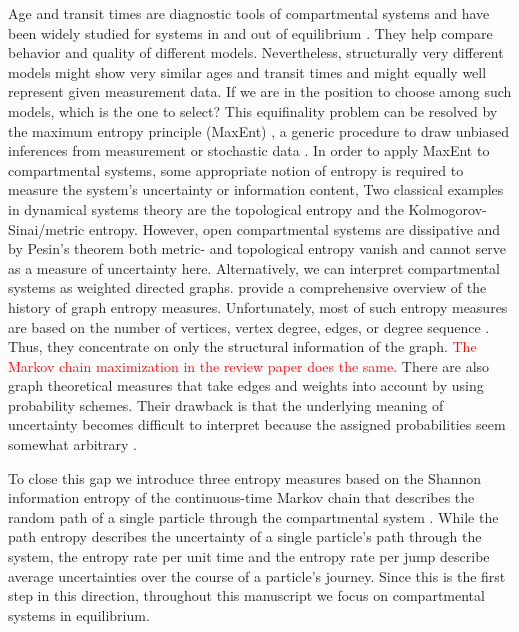 \documentclass[smallextended]{svjour3}
\newcommand{\red}[1]{\textcolor{red}{#1}}
\begin{document}
Age and transit times are diagnostic tools of compartmental systems and have been widely studied for systems in and out of equilibrium \citep{Eriksson1971ARoEaS, Bolin1973tellus, Rasmussen2016JMB, Sierra2016GlobChangBiol, Metzler2018MGS, MetzlerMuellerSierra2018PNAS}.
They help compare behavior and quality of different models.
Nevertheless, structurally very different models might show very similar ages and transit times and might equally well represent given measurement data.
If we are in the position to choose among such models, which is the one to select?
This equifinality problem can be resolved by the maximum entropy principle (MaxEnt) \citep{Jaynes1957PR1, Jaynes1957PR2}, a generic procedure to draw unbiased inferences from measurement or stochastic data \citep{Presse2013RMP}.
In order to apply MaxEnt to compartmental systems, some appropriate notion of entropy is required to measure the system's uncertainty or information content,
Two classical examples in dynamical systems theory are the topological entropy and the Kolmogorov-Sinai/metric entropy.
However, open compartmental systems are dissipative and by Pesin's theorem \citep{Pesin1977UMN} both metric- and topological entropy vanish and cannot serve as a measure of uncertainty here.
Alternatively, we can interpret compartmental systems as weighted directed graphs.
\citet{Dehmer2011IS} provide a comprehensive overview of the history of graph entropy measures.
Unfortunately, most of such entropy measures are based on the number of vertices, vertex degree, edges, or degree sequence \citep{Trucco1956BoMB}.
Thus, they concentrate on only the structural information of the graph.
\red{The Markov chain maximization in the review paper does the same.}
There are also graph theoretical measures that take edges and weights into account by using probability schemes.
Their drawback is that the underlying meaning of uncertainty becomes difficult to interpret because the assigned probabilities seem somewhat arbitrary \citep{Bonchev2005}.

To close this gap we introduce three entropy measures based on the Shannon information entropy \citep{Shannon1949TUoIP} of the continuous-time Markov chain that describes the random path of a single particle through the compartmental system \citep{Metzler2018MGS}.
While the path entropy describes the uncertainty of a single particle's path through the system, the entropy rate per unit time and the entropy rate per jump describe average uncertainties over the course of a particle's journey.
Since this is the first step in this direction, throughout this manuscript we focus on compartmental systems in equilibrium.
\end{document}
